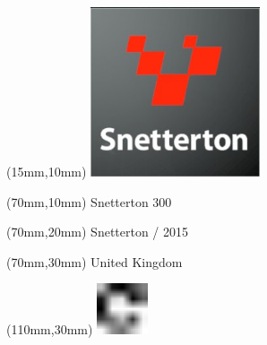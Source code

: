 \null\newpage
\begin{textblock*}{50mm}(15mm,10mm)%
\includegraphics[width=50mm]{LG/2015-05-20_00095.png}
\end{textblock*}
\begin{textblock*}{130mm}(70mm,10mm)%
{\fontsize{20}{20}\selectfont Snetterton 300}\\
\end{textblock*}
\begin{textblock*}{120mm}(70mm,20mm)%
{\fontsize{16}{16}\selectfont Snetterton / 2015}\\
\end{textblock*}
\begin{textblock*}{120mm}(70mm,30mm)%
{\fontsize{12}{12}\selectfont United Kingdom}
\end{textblock*}
\begin{textblock*}{30mm}(110mm,30mm)%
\centering
\includegraphics[height=15mm]{icons/fa-rotate-right.pdf}
\end{textblock*}
